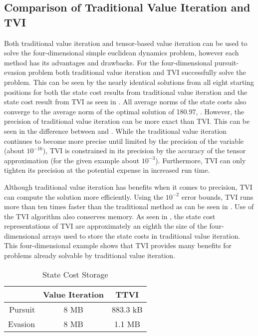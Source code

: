 \subsection{Comparison of Traditional Value Iteration and TVI}
Both traditional value iteration and tensor-based value iteration can be used to solve the four-dimensional simple euclidean dynamics problem, however each method has its advantages and drawbacks. For the four-dimensional pursuit-evasion problem both traditional value iteration and TVI successfully solve the problem. This can be seen by the nearly identical solutions from all eight starting positions for both the state cost results from traditional value iteration and the state cost result from TVI as seen in . All average norms of the state costs also converge to the average norm of the optimal solution of 180.97, . However, the precision of traditional value iteration can be more exact than TVI. This can be seen in the difference between  and . While the traditional value iteration continues to become more precise until limited by the precision of the variable (about $10^{-16}$), TVI is constrained in its precision by the accuracy of the tensor approximation (for the given example about $10^{-3}$). Furthermore, TVI can only tighten its precision at the potential expense in increased run time. 

Although traditional value iteration has benefits when it comes to precision, TVI can compute the solution more efficiently. Using the $10^{-2}$ error bounds, TVI runs more than ten times faster than the traditional method as can be seen in . Use of the TVI algorithm also conserves memory. As seen in , the state cost representations of TVI are approximately an eighth the size of the four-dimensional arrays used to store the state costs in traditional value iteration. This four-dimensional example shows that TVI provides many benefits for problems already solvable by traditional value iteration.
\begin{table}
\caption{State Cost Storage}
\label{4Dstore}
\begin{center}
\begin{tabular}{||r|c|c||}\hline
  & Value Iteration & TTVI \\\hline
Pursuit & 8 MB & 883.3 kB \\\hline
Evasion & 8 MB & 1.1 MB \\\hline
\end{tabular}
\end{center}
\end{table}

